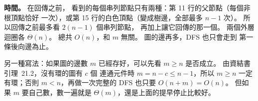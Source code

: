 \begin{pastsoln}
\textbf{時間。} 在回傳之前， 看到的每個串列節點只有兩種：第 11 行的父節點（每個非根頂點恰好
一次），或第 15 行的白色頂點（變成樹邊，全部最多 $n - 1$ 次）。 所以回傳之前最多看 $2(n - 1)$ 個串列節點，
再加上讓它回傳的那一個。 兩個外層迴圈各 $\Theta(n)$。 總共 $O(n)$，和 $m$ 無關。 圖的邊再多，DFS 也只會走到
第一條後向邊為止。

另一種寫法：如果圖的邊數 $m$ 已經存好，可以先看 $m \ge n$ 是否成立。 由資結書引理~21.2，沒有環的圖有 $c$ 個
連通元件時 $m = n - c \le n - 1$，所以 $m \ge n$ 一定有環；否則 $m < n$，再做一次完整的 DFS 也只要
$O(n + m) = O(n)$。 但如果 $m$ 要自己數，數一遍就是 $\Theta(m)$，還是上面的提早停止比較好。
\end{pastsoln}
